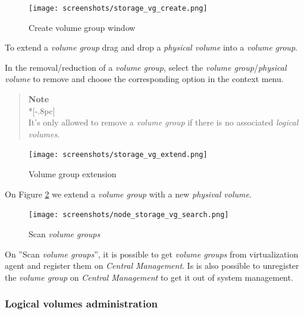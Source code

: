 \begin{figure}[H]
        \begin{center}
        \texttt{[image: screenshots/storage\_vg\_create.png]}
        \caption{Create volume group window}
        \label{fig:storage_vg_create}
        \end{center}
\end{figure}

To extend a \emph{volume group} drag and drop a \emph{physical volume} into a \emph{volume group}.

In the removal/reduction of a \emph{volume group}, select the \emph{volume group}/\emph{physical volume} to remove and choose the corresponding option in the context menu.

\begin{quote}
	{\large \bf Note} \\*[-.8pc]
	\underline{\hspace{6in}} \\
    It's only allowed to remove a \emph{volume group} if there is no associated \emph{logical volumes}.
\end{quote}
 
\begin{figure}[H]
        \begin{center}
        \texttt{[image: screenshots/storage\_vg\_extend.png]}
        \caption{Volume group extension}
        \label{fig:storage_vg_extend}
        \end{center}
\end{figure}

On Figure \ref{fig:storage_vg_extend} we extend a \emph{volume group} with a new \emph{physival volume}.

\begin{figure}[H]
        \begin{center}
        \texttt{[image: screenshots/node\_storage\_vg\_search.png]}
        \caption{Scan \emph{volume groups}}
        \label{fig:storage_vg_search}
        \end{center}
\end{figure}

On ''Scan \emph{volume groups}'', it is possible to get \emph{volume groups} from virtualization agent and register them on \emph{Central Management}.
Is is also possible to unregister the \emph{volume group} on \emph{Central Management} to get it out of system management.


\subsubsection{Logical volumes administration}

